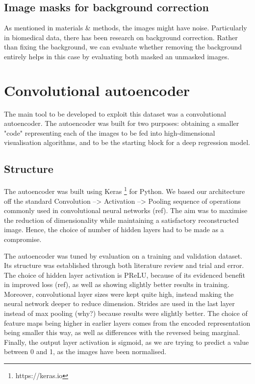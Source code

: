 \subsection{Image masks for background correction}
As mentioned in materials & methods, the images might have noise. Particularly in biomedical data, there has been research on background correction. Rather than fixing the background, we can evaluate whether removing the background entirely helps in this case by evaluating both masked an unmasked images.

\section{Convolutional autoencoder}

The main tool to be developed to exploit this dataset was a convolutional autoencoder. The autoencoder was built for two purposes: obtaining a smaller "code" representing each of the images to be fed into high-dimensional visualisation algorithms, and to be the starting block for a deep regression model.

\subsection{Structure}

The autoencoder was built using Keras \footnote{https://keras.io} for Python. We based our architecture off the standard Convolution --> Activation --> Pooling sequence of operations commonly used in convolutional neural networks (ref). The aim was to maximise the reduction of dimensionality while maintaining a satisfactory reconstructed image. Hence, the choice of number of hidden layers had to be made as a compromise. 

The autoencoder was tuned by evaluation on a training and validation dataset. Its structure was established through both literature review and trial and error. The choice of hidden layer activation is PReLU, because of its evidenced benefit in improved loss (ref), as well as showing slightly better results in training. Moreover, convolutional layer sizes were kept quite high, instead making the neural network deeper to reduce dimension. Strides are used in the last layer instead of max pooling (why?) because results were slightly better. The choice of feature maps being higher in earlier layers comes from the encoded representation being smaller this way, as well as differences with the reversed being marginal. Finally, the output layer activation is sigmoid, as we are trying to predict a value between 0 and 1, as the images have been normalised. 

